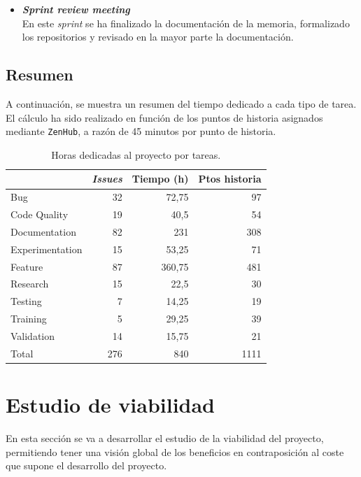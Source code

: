 \begin{itemize}
\item \textbf{\textit{Sprint review meeting}}\\
En este \textit{sprint} se ha finalizado la documentación de la memoria, formalizado los repositorios y revisado en la mayor parte la documentación. 

\end{itemize}

\FloatBarrier
\subsection{Resumen}
A continuación, se muestra un resumen del tiempo dedicado a cada tipo de tarea. El cálculo ha sido realizado en función de los puntos de historia asignados mediante \texttt{ZenHub}, a razón de 45 minutos por punto de historia.

\begin{table}[]
    \centering
    \begin{tabular}{lrrr}
	\toprule
        ~ & \textbf{\textit{Issues}} & \textbf{Tiempo (h)} & \textbf{Ptos historia} \\ 
        \toprule
        Bug & 32 & 72,75 & 97 \\ 
        Code Quality & 19 & 40,5 & 54 \\ 
        Documentation & 82 & 231 & 308 \\ 
        Experimentation & 15 & 53,25 & 71 \\
        Feature & 87 & 360,75 & 481 \\ 
        Research & 15 & 22,5 & 30 \\ 
        Testing & 7 & 14,25 & 19 \\ 
        Training & 5 & 29,25 & 39 \\ 
        Validation & 14 & 15,75 & 21 \\ 
    \midrule
        Total & 276 & 840 & 1111 \\ 
   	\bottomrule
    \end{tabular}
    \caption{Horas dedicadas al proyecto por tareas.}\label{tab:summary}
\end{table}


\newpage
\section{Estudio de viabilidad}
En esta sección se va a desarrollar el estudio de la viabilidad del proyecto, permitiendo tener una visión global de los beneficios en contraposición al coste que supone el desarrollo del proyecto.

